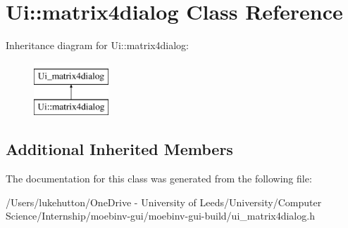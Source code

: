 \hypertarget{class_ui_1_1matrix4dialog}{}\section{Ui\+:\+:matrix4dialog Class Reference}
\label{class_ui_1_1matrix4dialog}
Inheritance diagram for Ui\+:\+:matrix4dialog\+:\begin{figure}[H]
\begin{center}
\leavevmode
\includegraphics[height=2.000000cm]{class_ui_1_1matrix4dialog}
\end{center}
\end{figure}
\subsection*{Additional Inherited Members}


The documentation for this class was generated from the following file\+:\begin{DoxyCompactItemize}
\item 
/\+Users/lukehutton/\+One\+Drive -\/ University of Leeds/\+University/\+Computer Science/\+Internship/moebinv-\/gui/moebinv-\/gui-\/build/ui\+\_\+matrix4dialog.\+h\end{DoxyCompactItemize}
